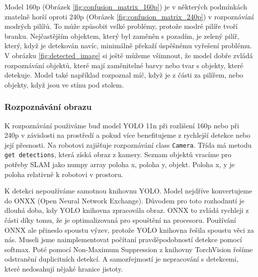 \documentclass[a4paper,12pt]{article}
\begin{document}
Model 160p (Obrázek \eqref{fig:confusion_matrix_160p}) je v některých podmínkách znatelně horší oproti 240p (Obrázek \eqref{fig:confusion_matrix_240p}) v rozpoznávání modrých pilířů.
To může způsobit velké problémy, protože modré pilíře tvoří branku. Nejčastějším objektem, který byl zaměněn s pozadím, je zelený pilíř, který, když je detekován navíc, minimálně překaží úspěšnému vyřešení problému.
V obrázku \eqref{fig:detected_image} si ještě můžeme všimnout, že model dobře zvládá rozpoznávání objektů, které mají zaměnitelné barvy nebo tvar s objekty, které detekuje.
Model také například rozpoznal míč, když je z části za pilířem, nebo objekty, když jsou ve stínu pod stolem.

\subsubsection{Rozpoznávání obrazu}
K rozpoznávání použiváme buď model YOLO 11n při rozlišení 160p nebo při 240p v závislosti na prostředí a pokud více benefitujeme z rychlejší detekce nebo její přesnosti.
Na robotovi zajišťuje rozpoznávání class \texttt{Camera}. Třída má metodu \texttt{get detections}, která získá obraz z kamery. 
Seznam objektů vracíme pro potřeby SLAM jako numpy array poloha x, poloha y, objekt. Poloha x, y je poloha relativně k robotovi v prostoru.

K detekci nepoužíváme samotnou knihovnu YOLO. Model nejdříve konvertujeme do ONXX (Open Neural Network Exchange). Důvodem pro toto rozhodnutí je dlouhá doba, kdy YOLO knihovna zpracovála obraz. ONNX to zvládá rychleji z části díky tomu, že je optimalizovaná pro spouštění na procesoru.
Používání ONNX ale přineslo spoustu výzev, protože YOLO knihovna řešila spoustu věci za nás. Museli jsme naimplementovat počítaní pravděpodobností detekce pomocí softmax. 
Poté pomocí Non-Maximum Suppression z knihovny TorchVision řešíme odstranění duplicitních detekcí. A samozřejmostí je nepracování s detekcemi, které nedosahují nějaké hranice jistoty.
\end{document}
